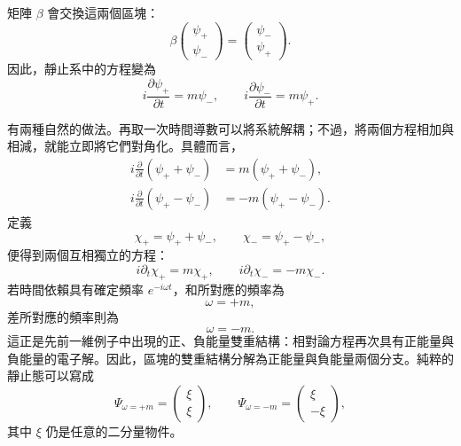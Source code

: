 \begin{classroomqa}
\end{classroomqa}

矩陣 \(\beta\) 會交換這兩個區塊：
\begin{equation}
\beta
\begin{pmatrix}
\psi_+\\
\psi_-
\end{pmatrix}
=
\begin{pmatrix}
\psi_-\\
\psi_+
\end{pmatrix}.
\end{equation}
因此，靜止系中的方程變為
\begin{equation}
i\frac{\partial\psi_+}{\partial t}=m\psi_-,
\qquad
i\frac{\partial\psi_-}{\partial t}=m\psi_+.
\end{equation}

有兩種自然的做法。再取一次時間導數可以將系統解耦；不過，將兩個方程相加與相減，就能立即將它們對角化。具體而言，
\begin{align}
i\frac{\partial}{\partial t}(\psi_++\psi_-)
&=m(\psi_++\psi_-),\\
i\frac{\partial}{\partial t}(\psi_+-\psi_-)
&=-m(\psi_+-\psi_-).
\end{align}
定義
\begin{equation}
\chi_+=\psi_++\psi_-,
\qquad
\chi_-=\psi_+-\psi_-,
\end{equation}
便得到兩個互相獨立的方程：
\begin{equation}
i\partial_t\chi_+=m\chi_+,
\qquad
i\partial_t\chi_-=-m\chi_-.
\end{equation}
若時間依賴具有確定頻率 \(e^{-i\omega t}\)，和所對應的頻率為
\begin{equation}
\omega=+m,
\end{equation}
差所對應的頻率則為
\begin{equation}
\omega=-m.
\end{equation}
這正是先前一維例子中出現的正、負能量雙重結構：相對論方程再次具有正能量與負能量的電子解。因此，區塊的雙重結構分解為正能量與負能量兩個分支。純粹的靜止態可以寫成
\begin{equation}
\Psi_{\omega=+m}=
\begin{pmatrix}
\xi\\
\xi
\end{pmatrix},
\qquad
\Psi_{\omega=-m}=
\begin{pmatrix}
\xi\\
-\xi
\end{pmatrix},
\end{equation}
其中 \(\xi\) 仍是任意的二分量物件。

